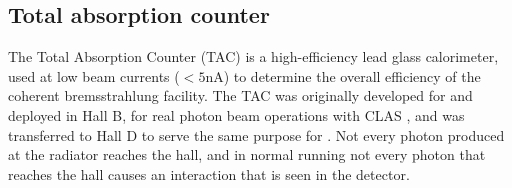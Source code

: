 %
%
%
%


\subsection{Total absorption counter \label{sec:tac}}
The Total Absorption Counter (TAC) is a high-efficiency lead glass calorimeter, used at low beam currents ($<5$nA) to determine the overall efficiency of the coherent bremsstrahlung facility.
The TAC was originally developed for and deployed in Hall B, for real photon beam operations with CLAS \cite{clasnote1992014, clasnote1993011, clasnote1999002}, and was transferred to Hall D to serve the same purpose for \GX{}.
Not every photon produced at the radiator reaches the hall, and in normal \GX{} running not every photon that reaches the hall causes an interaction that is seen in the \GX{} detector.

